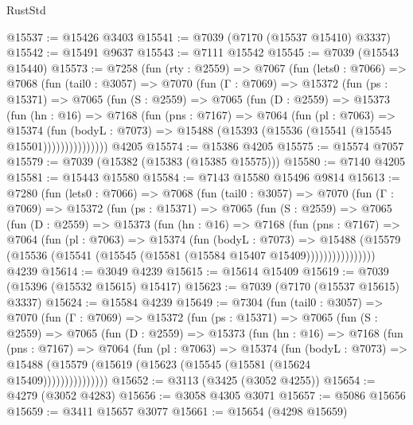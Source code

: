 \begin{lexlean}{RustStd}
\begin{coremodule}
@15537 := @15426 @3403
@15541 := @7039 (@7170 (@15537 @15410) @3337)
@15542 := @15491 @9637
@15543 := @7111 @15542
@15545 := @7039 (@15543 @15440)
@15573 := @7258
    (fun (rty : @2559) =>
    @7067
      (fun (lets0 : @7066) =>
      @7068
        (fun (tail0 : @3057) =>
        @7070
          (fun (Γ : @7069) =>
          @15372
            (fun (ps : @15371) =>
            @7065
              (fun (S : @2559) =>
              @7065
                (fun (D : @2559) =>
                @15373
                  (fun (hn : @16) =>
                  @7168
                    (fun (pns : @7167) =>
                    @7064
                      (fun (pl : @7063) =>
                      @15374
                        (fun (bodyL : @7073) =>
                        @15488 (@15393 (@15536 (@15541 (@15545 @15501)))))))))))))))
    @4205
@15574 := @15386 @4205
@15575 := @15574 @7057
@15579 := @7039 (@15382 (@15383 (@15385 @15575)))
@15580 := @7140 @4205
@15581 := @15443 @15580
@15584 := @7143 @15580 @15496 @9814
@15613 := @7280
    (fun (lets0 : @7066) =>
    @7068
      (fun (tail0 : @3057) =>
      @7070
        (fun (Γ : @7069) =>
        @15372
          (fun (ps : @15371) =>
          @7065
            (fun (S : @2559) =>
            @7065
              (fun (D : @2559) =>
              @15373
                (fun (hn : @16) =>
                @7168
                  (fun (pns : @7167) =>
                  @7064
                    (fun (pl : @7063) =>
                    @15374
                      (fun (bodyL : @7073) =>
                      @15488
                        (@15579
                          (@15536 (@15541 (@15545 (@15581 (@15584 @15407 @15409))))))))))))))))
    @4239
@15614 := @3049 @4239
@15615 := @15614 @15409
@15619 := @7039 (@15396 (@15532 @15615) @15417)
@15623 := @7039 (@7170 (@15537 @15615) @3337)
@15624 := @15584 @4239
@15649 := @7304
    (fun (tail0 : @3057) =>
    @7070
      (fun (Γ : @7069) =>
      @15372
        (fun (ps : @15371) =>
        @7065
          (fun (S : @2559) =>
          @7065
            (fun (D : @2559) =>
            @15373
              (fun (hn : @16) =>
              @7168
                (fun (pns : @7167) =>
                @7064
                  (fun (pl : @7063) =>
                  @15374
                    (fun (bodyL : @7073) =>
                    @15488 (@15579 (@15619 (@15623 (@15545 (@15581 (@15624 @15409)))))))))))))))
@15652 := @3113 (@3425 (@3052 @4255))
@15654 := @4279 (@3052 @4283)
@15656 := @3058 @4305 @3071
@15657 := @5086 @15656
@15659 := @3411 @15657 @3077
@15661 := @15654 (@4298 @15659)

\end{coremodule}
\end{lexlean}
